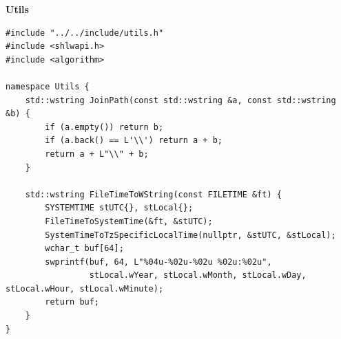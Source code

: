 \textbf{Utils}
\begin{lstlisting}[style=CodeListing]
#include "../../include/utils.h"
#include <shlwapi.h>
#include <algorithm>

namespace Utils {
    std::wstring JoinPath(const std::wstring &a, const std::wstring &b) {
        if (a.empty()) return b;
        if (a.back() == L'\\') return a + b;
        return a + L"\\" + b;
    }
    
    std::wstring FileTimeToWString(const FILETIME &ft) {
        SYSTEMTIME stUTC{}, stLocal{};
        FileTimeToSystemTime(&ft, &stUTC);
        SystemTimeToTzSpecificLocalTime(nullptr, &stUTC, &stLocal);
        wchar_t buf[64];
        swprintf(buf, 64, L"%04u-%02u-%02u %02u:%02u",
                 stLocal.wYear, stLocal.wMonth, stLocal.wDay, stLocal.wHour, stLocal.wMinute);
        return buf;
    }
}
\end{lstlisting}


